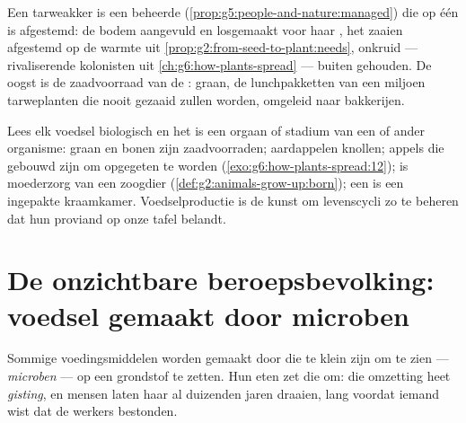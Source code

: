 \begin{example}\label{ex:g6:producing-our-food:wheat}
Een tarweakker is een beheerde 
(\cref{prop:g5:people-and-nature:managed}) die op één  is
afgestemd: de bodem aangevuld en losgemaakt voor haar , het zaaien
afgestemd op de warmte uit \cref{prop:g2:from-seed-to-plant:needs},
onkruid --- rivaliserende kolonisten uit
\cref{ch:g6:how-plants-spread} --- buiten gehouden. De oogst is de
zaadvoorraad van de : graan, de lunchpakketten van een miljoen
tarweplanten die nooit gezaaid zullen worden, omgeleid naar bakkerijen.
\end{example}

\begin{remark}\label{rem:g6:producing-our-food:stage}
Lees elk voedsel biologisch en het is een orgaan of stadium van een of
ander organisme: graan en bonen zijn zaadvoorraden; aardappelen knollen;
appels  die gebouwd zijn om opgegeten te worden
(\cref{exo:g6:how-plants-spread:12});  is moederzorg van een zoogdier
(\cref{def:g2:animals-grow-up:born}); een  is een ingepakte
kraamkamer. Voedselproductie is de kunst om levenscycli zo te beheren dat
hun proviand op onze tafel belandt.
\end{remark}

\section{De onzichtbare beroepsbevolking: voedsel gemaakt door microben}

\begin{definition}[Gisting]\label{def:g6:producing-our-food:fermentation}
Sommige voedingsmiddelen worden gemaakt door  die te klein
zijn om te zien --- \emph{microben} --- op een
grondstof te zetten. Hun eten zet die om: die omzetting heet
\emph{gisting}, en mensen laten haar al duizenden jaren
draaien, lang voordat iemand wist dat de werkers bestonden.
\end{definition}

